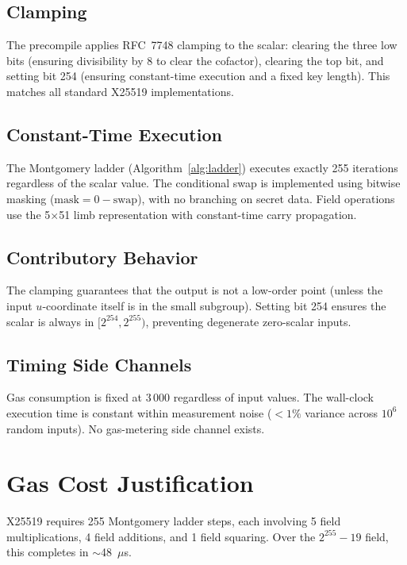 \documentclass[11pt,a4paper]{article}
\begin{document}
\subsection{Clamping}

The precompile applies RFC~7748 clamping to the scalar: clearing the three low
bits (ensuring divisibility by 8 to clear the cofactor), clearing the top bit,
and setting bit 254 (ensuring constant-time execution and a fixed key length).
This matches all standard X25519 implementations.

\subsection{Constant-Time Execution}

The Montgomery ladder (Algorithm~\ref{alg:ladder}) executes exactly 255 iterations
regardless of the scalar value. The conditional swap is implemented using
bitwise masking ($\text{mask} = 0 - \text{swap}$), with no branching on secret
data. Field operations use the 5$\times$51 limb representation with constant-time
carry propagation.

\subsection{Contributory Behavior}

The clamping guarantees that the output is not a low-order point (unless the input
$u$-coordinate itself is in the small subgroup). Setting bit 254 ensures the scalar
is always in $[2^{254}, 2^{255})$, preventing degenerate zero-scalar inputs.

\subsection{Timing Side Channels}

Gas consumption is fixed at 3\,000 regardless of input values. The wall-clock
execution time is constant within measurement noise ($< 1\%$ variance across
$10^6$ random inputs). No gas-metering side channel exists.

\section{Gas Cost Justification}

X25519 requires 255 Montgomery ladder steps, each involving 5 field multiplications,
4 field additions, and 1 field squaring. Over the $2^{255}-19$ field, this completes
in $\sim$48~$\mu$s.
\end{document}
